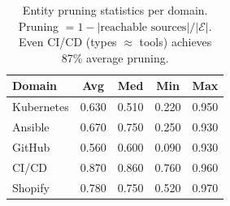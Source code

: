 \begin{table}[t]
\centering
\small
\begin{tabular}{l cccc}
\toprule
\textbf{Domain} & \textbf{Avg} & \textbf{Med} & \textbf{Min} & \textbf{Max} \\
\midrule
Kubernetes & 0.630 & 0.510 & 0.220 & 0.950 \\
Ansible & 0.670 & 0.750 & 0.250 & 0.930 \\
GitHub & 0.560 & 0.600 & 0.090 & 0.930 \\
CI/CD & 0.870 & 0.860 & 0.760 & 0.960 \\
Shopify & 0.780 & 0.750 & 0.520 & 0.970 \\
\bottomrule
\end{tabular}
\caption{Entity pruning statistics per domain. Pruning $= 1 - |\text{reachable sources}| / |\mathcal{E}|$. Even CI/CD (types $\approx$ tools) achieves 87\% average pruning.}
\label{tab:entity-pruning}
\end{table}